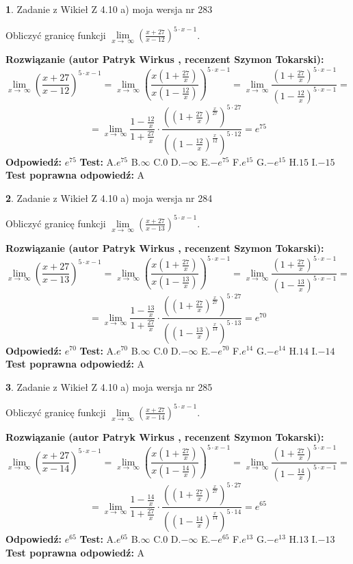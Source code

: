 \documentclass[12pt, a4paper]{article}
\theoremstyle{definition} %
\newtheorem{zad}{}
\newcommand{\zadStart}[1]{\begin{zad}#1\newline}
\newcommand{\zadStop}{\end{zad}}
\newcommand{\rozwStart}[2]{\noindent \textbf{Rozwiązanie (autor #1 , recenzent #2): }\newline}
\newcommand{\rozwStop}{\newline}
\newcommand{\odpStart}{\noindent \textbf{Odpowiedź:}\newline}
\newcommand{\odpStop}{\newline}
\newcommand{\testStart}{\noindent \textbf{Test:}\newline}
\newcommand{\testStop}{\newline}
\newcommand{\kluczStart}{\noindent \textbf{Test poprawna odpowiedź:}\newline}
\newcommand{\kluczStop}{\newline}
\begin{document}
\zadStart{Zadanie z Wikieł Z 4.10 a) moja wersja nr 283}

Obliczyć granicę funkcji  $\lim\limits_{x\to\ \infty}(\frac{x+27}{x-12})^{5\cdot x-1}$.
\zadStop
\rozwStart{Patryk Wirkus}{Szymon Tokarski}
$$\lim\limits_{x\to\ \infty}(\frac{x+27}{x-12})^{5\cdot x-1} = \lim\limits_{x\to\ \infty}(\frac{x(1+\frac{27}{x})}{x(1-\frac{12}{x})})^{5\cdot x-1}=\lim\limits_{x\to\ \infty}\frac{(1+\frac{27}{x})^{5\cdot x-1}}{(1-\frac{12}{x})^{5\cdot x-1}}=$$
$$=\lim\limits_{x\to\ \infty}\frac{1-\frac{12}{x}}{1+\frac{27}{x}}\cdot\frac{((1+\frac{27}{x})^{\frac{x}{27}})^{5\cdot27}}{((1-\frac{12}{x})^{\frac{x}{12}})^{5\cdot12}}=e^{75}$$
\rozwStop
\odpStart
$e^{75}$
\odpStop
\testStart
A.$e^{75}$ B.$\infty$ C.$0$ D.$-\infty$ E.$-e^{75}$
F.$e^{15}$ G.$-e^{15}$
H.$15$
I.$-15$
\testStop
\kluczStart
A
\kluczStop



\zadStart{Zadanie z Wikieł Z 4.10 a) moja wersja nr 284}

Obliczyć granicę funkcji  $\lim\limits_{x\to\ \infty}(\frac{x+27}{x-13})^{5\cdot x-1}$.
\zadStop
\rozwStart{Patryk Wirkus}{Szymon Tokarski}
$$\lim\limits_{x\to\ \infty}(\frac{x+27}{x-13})^{5\cdot x-1} = \lim\limits_{x\to\ \infty}(\frac{x(1+\frac{27}{x})}{x(1-\frac{13}{x})})^{5\cdot x-1}=\lim\limits_{x\to\ \infty}\frac{(1+\frac{27}{x})^{5\cdot x-1}}{(1-\frac{13}{x})^{5\cdot x-1}}=$$
$$=\lim\limits_{x\to\ \infty}\frac{1-\frac{13}{x}}{1+\frac{27}{x}}\cdot\frac{((1+\frac{27}{x})^{\frac{x}{27}})^{5\cdot27}}{((1-\frac{13}{x})^{\frac{x}{13}})^{5\cdot13}}=e^{70}$$
\rozwStop
\odpStart
$e^{70}$
\odpStop
\testStart
A.$e^{70}$ B.$\infty$ C.$0$ D.$-\infty$ E.$-e^{70}$
F.$e^{14}$ G.$-e^{14}$
H.$14$
I.$-14$
\testStop
\kluczStart
A
\kluczStop



\zadStart{Zadanie z Wikieł Z 4.10 a) moja wersja nr 285}

Obliczyć granicę funkcji  $\lim\limits_{x\to\ \infty}(\frac{x+27}{x-14})^{5\cdot x-1}$.
\zadStop
\rozwStart{Patryk Wirkus}{Szymon Tokarski}
$$\lim\limits_{x\to\ \infty}(\frac{x+27}{x-14})^{5\cdot x-1} = \lim\limits_{x\to\ \infty}(\frac{x(1+\frac{27}{x})}{x(1-\frac{14}{x})})^{5\cdot x-1}=\lim\limits_{x\to\ \infty}\frac{(1+\frac{27}{x})^{5\cdot x-1}}{(1-\frac{14}{x})^{5\cdot x-1}}=$$
$$=\lim\limits_{x\to\ \infty}\frac{1-\frac{14}{x}}{1+\frac{27}{x}}\cdot\frac{((1+\frac{27}{x})^{\frac{x}{27}})^{5\cdot27}}{((1-\frac{14}{x})^{\frac{x}{14}})^{5\cdot14}}=e^{65}$$
\rozwStop
\odpStart
$e^{65}$
\odpStop
\testStart
A.$e^{65}$ B.$\infty$ C.$0$ D.$-\infty$ E.$-e^{65}$
F.$e^{13}$ G.$-e^{13}$
H.$13$
I.$-13$
\testStop
\kluczStart
A
\kluczStop
\end{document}
